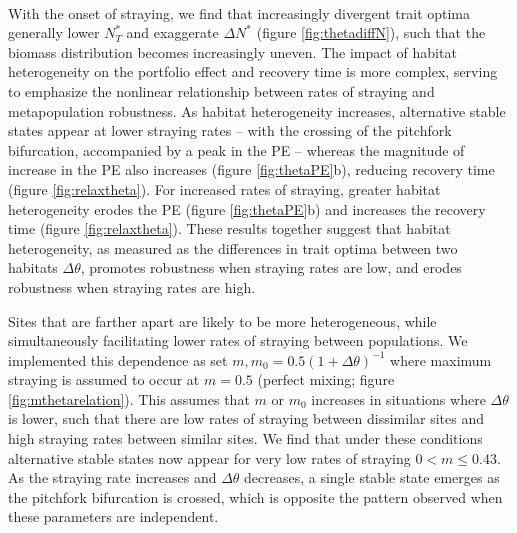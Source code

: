 \documentclass{revtex4}
\begin{document}
\\ 
\noindent With the onset of straying, we find that increasingly divergent trait optima generally lower $N_T^*$ and exaggerate $\Delta N^*$ (figure \ref{fig:thetadiffN}), such that the biomass distribution becomes increasingly uneven. %
The impact of habitat heterogeneity on the portfolio effect and recovery time is more complex, serving to emphasize the nonlinear relationship between rates of straying and metapopulation robustness. %
As habitat heterogeneity increases, alternative stable states appear at lower straying rates -- with the crossing of the pitchfork bifurcation, accompanied by a peak in the PE -- whereas the magnitude of increase in the PE also increases (figure \ref{fig:thetaPE}b), reducing recovery time (figure \ref{fig:relaxtheta}).
For increased rates of straying, greater habitat heterogeneity erodes the PE (figure \ref{fig:thetaPE}b) and increases the recovery time (figure \ref{fig:relaxtheta}).
These results together suggest that habitat heterogeneity, as measured as the differences in trait optima between two habitats $\Delta\theta$, promotes robustness when straying rates are low, and erodes robustness when straying rates are high.

Sites that are farther apart are likely to be more heterogeneous, while simultaneously facilitating lower rates of straying between populations.
We implemented this dependence as set $m,m_0 = 0.5(1 + \Delta\theta)^{-1}$ where maximum straying is assumed to occur at $m=0.5$ (perfect mixing; figure \ref{fig:mthetarelation}).
This assumes that $m$ or $m_0$ increases in situations where $\Delta\theta$ is lower, such that there are low rates of straying between dissimilar sites and high straying rates between similar sites.
We find that under these conditions alternative stable states now appear for very low rates of straying $0 < m \leq 0.43$.
As the straying rate increases and $\Delta\theta$ decreases, a single stable state emerges as the pitchfork bifurcation is crossed, which is opposite the pattern observed when these parameters are independent.
\end{document}
